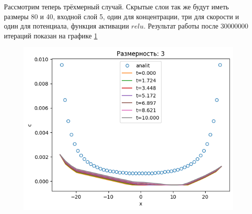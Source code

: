 Рассмотрим теперь трёхмерный случай. Скрытые слои так же будут иметь размеры 80 и 40, входной слой 5, один для концентрации, три для скорости и один для потенциала, функция активации $relu$. Результат работы после 30000000 итераций показан на графике \ref{fig:3dres}

\begin{figure}[ht]
    \includegraphics[scale=0.5]{../plots/3dim relu 80 20 30000000.png}
    \caption{}
    \label{fig:3dres}
\end{figure}
